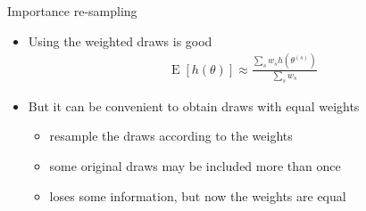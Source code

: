 \documentclass[english,t]{beamer}
\DeclareMathOperator{\E}{E}
\begin{document}
\begin{frame}{Importance re-sampling}

  \begin{itemize}
  \item<+-> Using the weighted draws is good
    \begin{align*}
      \E[h(\theta)] \approx \frac{\sum_s w_s h(\theta^{(s)})}{\sum_s w_s}
    \end{align*}
  \item<+-> But it can be convenient to obtain draws with equal weights
    \begin{itemize}
    \item resample the draws according to the weights
    \item some original draws may be included more than once
    \item loses some information, but now the weights are equal
    \end{itemize}
  \end{itemize}

\end{frame}
\end{document}
